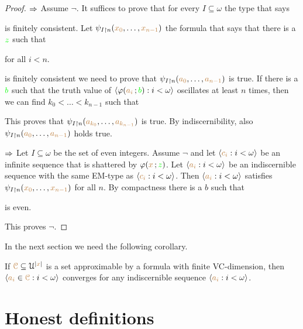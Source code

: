 \documentclass[creche.tex]{subfiles}
\begin{document}
\begin{proof}
$\Rightarrow$ Assume $\neg$. It suffices to prove that for every $I\subseteq\omega$ the type that says 


is finitely consistent. Let $\psi_{I\restriction n}({\color{brown} x_0},\dots,{\color{brown} x_{n-1}})$ the formula that says that there is a ${\color{green} z}$ such that

\quad for all $i<n$.

is finitely consistent we need to prove that $\psi_{I\restriction n}({\color{brown} a_0},\dots,{\color{brown} a_{n-1}})$ is true. If there is a ${\color{green} b}$ such that the truth value of $\langle\varphi({\color{brown} a_i}\,;{\color{green} b}):i<\omega\rangle$ oscillates at least $n$ times, then we can find $k_0<\dots<k_{n-1}$ such that 



This proves that $\psi_{I\restriction n}({\color{brown} a_{k_0}},\dots,{\color{brown} a_{k_{n-1}}})$ is true. By indiscernibility, also $\psi_{I\restriction n}({\color{brown} a_0},\dots,{\color{brown} a_{n-1}})$ holds true.

$\Rightarrow$ Let $I\subseteq\omega$ be the set of even integers. Assume $\neg$ and let  $\langle{\color{brown}c_i}:i<\omega\rangle$ be an infinite sequence that is shattered by $\varphi({\color{brown} x}\,;{\color{green} z})$.
Let  $\langle{\color{brown}a_i}:i<\omega\rangle$ be an indiscernible sequence with the same EM-type as $\langle{\color{brown}c_i}:i<\omega\rangle$. Then $\langle{\color{brown}a_i}:i<\omega\rangle$ satisfies $\psi_{I\restriction n}({\color{brown} x_0},\dots,{\color{brown} x_{n-1}})$ for all $n$. By compactness there is a $b$ such that

\quad is even.

This proves $\neg$.
\end{proof}

In the next section we need the following corollary.

\begin{corollary}\label{corol_altrank}
If ${\color{brown}\EuScript C}\subseteq\EuScript U^{|{\color{brown} x}|}$ is a set approximable by a formula with finite VC-dimension, then $\langle{\color{brown}a_i}\in{\color{brown}\EuScript C}:i<\omega\rangle$ converges for any indiscernible sequence $\langle{\color{brown}a_i}:i<\omega\rangle$.\QED
\end{corollary}


\section{Honest definitions}
\label{-theory}
\end{document}
